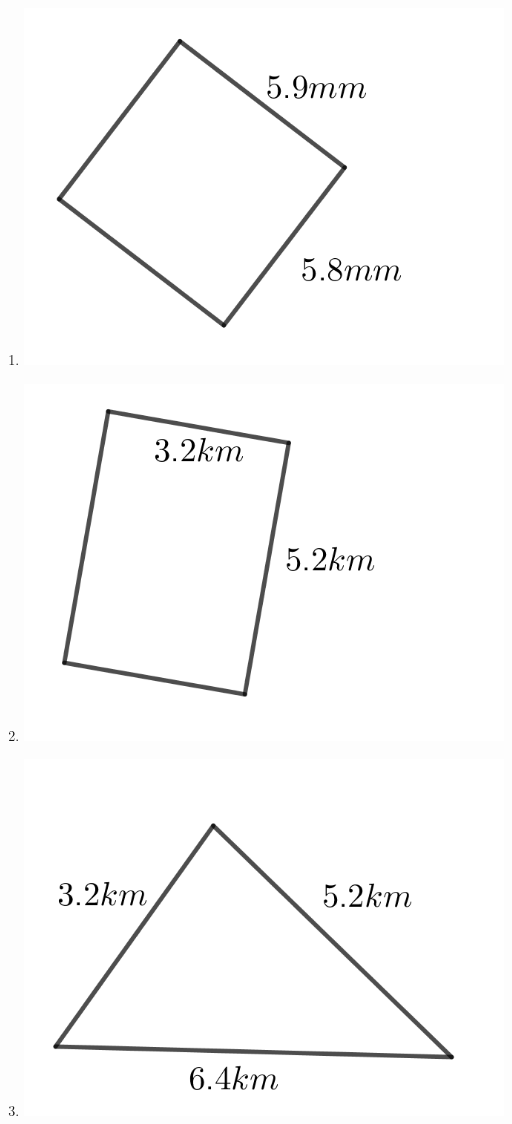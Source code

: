 \begin{multicols}{2}
\begin{enumerate}
	\item \includegraphics{./Images/Measurement/perimeter3.png}
	\item \includegraphics{./Images/Measurement/perimeter4.png}
	\item \includegraphics{./Images/Measurement/perimeter5.png}

\end{enumerate}
\end{multicols}
